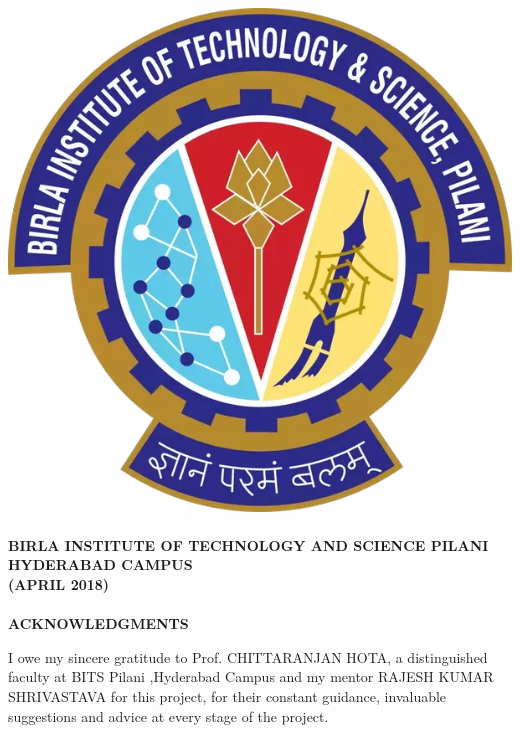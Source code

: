 \documentclass{report}
\begin{document}
\paragraph{}
\begin{center}
\includegraphics[scale=0.1]{bits_logo.png} 
\end{center}

\paragraph{}
\begin{center}
\textbf{BIRLA INSTITUTE OF TECHNOLOGY AND SCIENCE PILANI} \\
\textbf{HYDERABAD CAMPUS} \\
\textbf{(APRIL 2018) }
\end{center}

\thispagestyle{empty}
\newpage





\paragraph{}
\begin{center}
\textbf{\Large{ACKNOWLEDGMENTS}} \\[30pt]
\end{center}
I owe my sincere gratitude to Prof. CHITTARANJAN HOTA, a distinguished faculty at BITS Pilani ,Hyderabad Campus and my mentor RAJESH KUMAR SHRIVASTAVA for this project, for their constant
guidance, invaluable suggestions and advice at every stage of the project.
\end{document}
